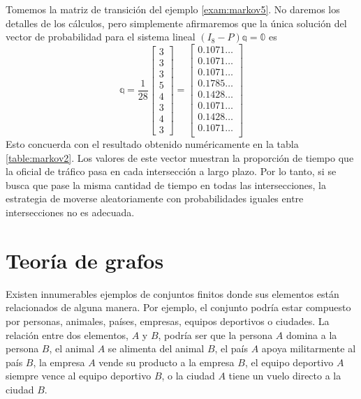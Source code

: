 \begin{example}
    Tomemos la matriz de transición del ejemplo \ref{exam:markov5}. No daremos los detalles de los cálculos, pero simplemente afirmaremos que la única solución del vector de probabilidad para el sistema lineal $(I_8 - P)\mathbb{q} = \mathbb{0}$ es\newpage
    $$\mathbb{q} = \frac{1}{28} \begin{bmatrix}
        3 \\
        3 \\
        3 \\
        5 \\
        4 \\
        3 \\
        4 \\
        3
    \end{bmatrix} = \begin{bmatrix}
        0.1071\dots \\
        0.1071\dots \\
        0.1071\dots \\
        0.1785\dots \\
        0.1428\dots \\
        0.1071\dots \\
        0.1428\dots \\
        0.1071\dots \\
    \end{bmatrix}$$
    Esto concuerda con el resultado obtenido numéricamente en la tabla \ref{table:markov2}. Los valores de este vector muestran la proporción de tiempo que la oficial de tráfico pasa en cada intersección a largo plazo. Por lo tanto, si se busca que pase la misma cantidad de tiempo en todas las intersecciones, la estrategia de moverse aleatoriamente con probabilidades iguales entre intersecciones no es adecuada.
\end{example}

\section{Teoría de grafos}

Existen innumerables ejemplos de conjuntos finitos donde sus elementos están relacionados de alguna manera. Por ejemplo, el conjunto podría estar compuesto por personas, animales, países, empresas, equipos deportivos o ciudades. La relación entre dos elementos, $A$ y $B$, podría ser que la persona $A$ domina a la persona $B$, el animal $A$ se alimenta del animal $B$, el país $A$ apoya militarmente al país $B$, la empresa $A$ vende su producto a la empresa $B$, el equipo deportivo $A$ siempre vence al equipo deportivo $B$, o la ciudad $A$ tiene un vuelo directo a la ciudad $B$.

